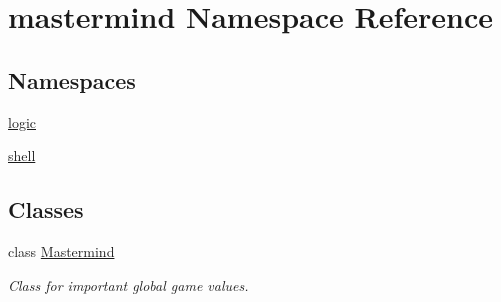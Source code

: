 \hypertarget{namespacemastermind}{}\section{mastermind Namespace Reference}
\label{namespacemastermind}
\subsection*{Namespaces}
\begin{DoxyCompactItemize}
\item 
 \hyperlink{namespacemastermind_1_1logic}{logic}
\item 
 \hyperlink{namespacemastermind_1_1shell}{shell}
\end{DoxyCompactItemize}
\subsection*{Classes}
\begin{DoxyCompactItemize}
\item 
class \hyperlink{classmastermind_1_1_mastermind}{Mastermind}
\begin{DoxyCompactList}\small\item\em Class for important global game values. \end{DoxyCompactList}\end{DoxyCompactItemize}
